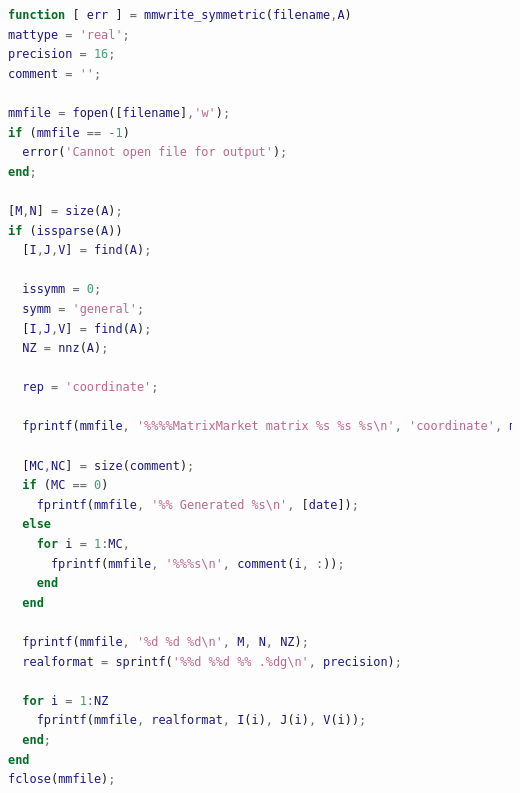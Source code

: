 \documentclass[11pt,italian]{article}
\begin{document}
\newpage
\begin{lstlisting}[language=MatLab,basicstyle=\footnotesize\ttfamily,caption=Funzione di conversione da \lstinline{.mat} a \lstinline{.mtx} per matrici simmetriche]
function [ err ] = mmwrite_symmetric(filename,A)
mattype = 'real';
precision = 16;
comment = '';

mmfile = fopen([filename],'w');
if (mmfile == -1)
  error('Cannot open file for output');
end;

[M,N] = size(A);
if (issparse(A))
  [I,J,V] = find(A);

  issymm = 0;
  symm = 'general';
  [I,J,V] = find(A);
  NZ = nnz(A);

  rep = 'coordinate';

  fprintf(mmfile, '%%%%MatrixMarket matrix %s %s %s\n', 'coordinate', mattype, symm);

  [MC,NC] = size(comment);
  if (MC == 0)
    fprintf(mmfile, '%% Generated %s\n', [date]);
  else
    for i = 1:MC,
      fprintf(mmfile, '%%%s\n', comment(i, :));
    end
  end

  fprintf(mmfile, '%d %d %d\n', M, N, NZ);
  realformat = sprintf('%%d %%d %% .%dg\n', precision);

  for i = 1:NZ
    fprintf(mmfile, realformat, I(i), J(i), V(i));
  end;
end
fclose(mmfile);
\end{lstlisting}
\end{document}
